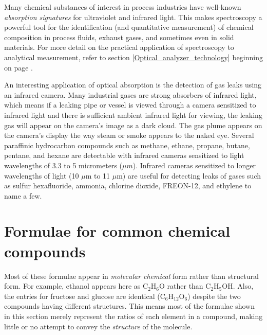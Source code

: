Many chemical substances of interest in process industries have well-known \textit{absorption signatures} for ultraviolet and infrared light.  This makes spectroscopy a powerful tool for the identification (and quantitative measurement) of chemical composition in process fluids, exhaust gases, and sometimes even in solid materials.  For more detail on the practical application of spectroscopy to analytical measurement, refer to section \ref{Optical_analyzer_technology} beginning on page \pageref{Optical_analyzer_technology}.

\vskip 10pt

An interesting application of optical absorption is the detection of gas leaks using an infrared camera.  Many industrial gases are strong absorbers of infrared light, which means if a leaking pipe or vessel is viewed through a camera sensitized to infrared light and there is sufficient ambient infrared light for viewing, the leaking gas will appear on the camera's image as a dark cloud.  The gas plume appears on the camera's display the way steam or smoke appears to the naked eye.  Several paraffinic hydrocarbon compounds such as methane, ethane, propane, butane, pentane, and hexane are detectable with infrared cameras sensitized to light wavelengths of 3.3 to 5 micrometers ($\mu m$).  Infrared cameras sensitized to longer wavelengths of light (10 $\mu$m to 11 $\mu$m) are useful for detecting leaks of gases such as sulfur hexafluoride, ammonia, chlorine dioxide, FREON-12, and ethylene to name a few.















\filbreak
\section{Formulae for common chemical compounds}

Most of these formulae appear in \textit{molecular chemical} form rather than structural form.  For example, ethanol appears here as C$_{2}$H$_{6}$O rather than C$_{2}$H$_{5}$OH.  Also, the entries for fructose and glucose are identical (C$_{6}$H$_{12}$O$_{6}$) despite the two compounds having different structures.  This means most of the formulae shown in this section merely represent the ratios of each element in a compound, making little or no attempt to convey the \textit{structure} of the molecule.

